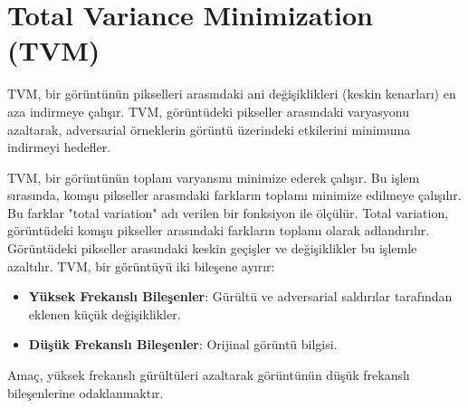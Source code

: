 \section{Total Variance Minimization (TVM)}

TVM, bir görüntünün pikselleri arasındaki ani değişiklikleri (keskin kenarları) en aza indirmeye çalışır. TVM, görüntüdeki pikseller arasındaki varyasyonu azaltarak, adversarial örneklerin görüntü üzerindeki etkilerini minimuma indirmeyi hedefler. 

TVM, bir görüntünün toplam varyansını minimize ederek çalışır. Bu işlem sırasında, komşu pikseller arasındaki farkların toplamı minimize edilmeye çalışılır. Bu farklar "total variation" adı verilen bir fonksiyon ile ölçülür. Total variation, görüntüdeki komşu pikseller arasındaki farkların toplamı olarak adlandırılır. Görüntüdeki pikseller arasındaki keskin geçişler ve değişiklikler bu işlemle azaltılır. TVM, bir görüntüyü iki bileşene ayırır:

\begin{itemize}
    \item \textbf{Yüksek Frekanslı Bileşenler}: Gürültü ve adversarial saldırılar tarafından eklenen küçük değişiklikler.
    \item \textbf{Düşük Frekanslı Bileşenler}: Orijinal görüntü bilgisi.
\end{itemize}

Amaç, yüksek frekanslı gürültüleri azaltarak görüntünün düşük frekanslı bileşenlerine odaklanmaktır.

\newpage